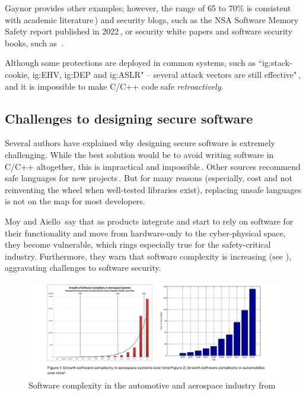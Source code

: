 \documentclass[nomenclature, english, bibtex]{kththesis}
\begin{document}
Gaynor provides other examples; however, the range of 65 to 70\% is consistent with academic literature\,\cite{mergendahl_cross-language_2022,scherer_engineering_2021, li_improving_2014}) and security blogs, such as the \gls{NSA} Software Memory Safety report published in 2022\,\cite{noauthor_nsa_2022}, or security white papers and software security books, such as~\cite{chapman_adacore_2018}.

Although some protections are deployed in common systems, such as ``\gls{ig:stack-cookie}, \gls{ig:EHV}, \gls{ig:DEP} and \gls{ig:ASLR}" -- several attack vectors are still effective"\,\cite{szekeres_sok_2013}, and it is impossible to make C/C++ code safe \emph{retroactively}. 

\subsection{Challenges to designing secure software}

Several authors have explained why designing secure software is extremely challenging. While the best solution would be to avoid writing software in C/C++ altogether, this is impractical and impossible\,\cite{szekeres_sok_2013}. Other sources recommend safe languages for new projects\,\cite{scherer_engineering_2021}. But for many reasons (especially, cost and not reinventing the wheel when well-tested libraries exist), replacing unsafe languages is not on the map for most developers.

Moy and Aiello\,\cite{moy_when_2020} say that as products integrate and start to rely on software for their functionality and move from hardware-only to the cyber-physical space, they become vulnerable, which rings especially true for the \gls{safety-critical} industry. Furthermore, they warn that software complexity is increasing (see ), aggravating challenges to software security.

 
\begin{figure}[!ht]
  \begin{center}
    \includegraphics[width=1\textwidth]{figures/complexity.png}
  \end{center}
  \caption[Software complexity, automotive/aerospace]{Software complexity in the automotive and aerospace industry from\,\cite{moy_when_2020}}
  \label{fig:complexity}
\end{figure}
\FloatBarrier
\end{document}
